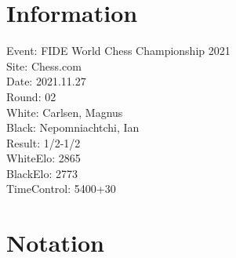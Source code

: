 \documentclass[a4paper]{article}
\begin{document}
\section{Information}
Event: FIDE World Chess Championship 2021\\ 
Site: Chess.com\\ 
Date: 2021.11.27\\ 
Round: 02\\ 
White: Carlsen, Magnus\\ 
Black: Nepomniachtchi, Ian\\ 
Result: 1/2-1/2\\ 
WhiteElo: 2865\\ 
BlackElo: 2773\\ 
TimeControl: 5400+30\\ 


\section{Notation}
\end{document}

